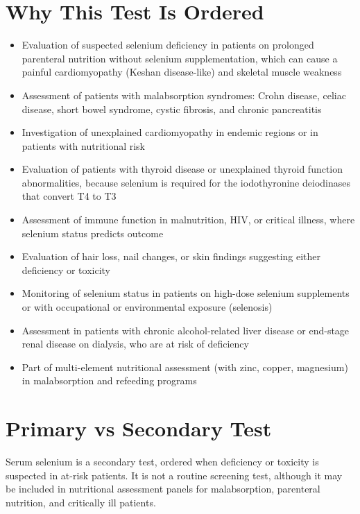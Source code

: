 \section*{Why This Test Is Ordered}
\begin{itemize}
  \item Evaluation of suspected selenium deficiency in patients on prolonged parenteral nutrition without selenium supplementation, which can cause a painful cardiomyopathy (Keshan disease-like) and skeletal muscle weakness
  \item Assessment of patients with malabsorption syndromes: Crohn disease, celiac disease, short bowel syndrome, cystic fibrosis, and chronic pancreatitis
  \item Investigation of unexplained cardiomyopathy in endemic regions or in patients with nutritional risk
  \item Evaluation of patients with thyroid disease or unexplained thyroid function abnormalities, because selenium is required for the iodothyronine deiodinases that convert T4 to T3
  \item Assessment of immune function in malnutrition, HIV, or critical illness, where selenium status predicts outcome
  \item Evaluation of hair loss, nail changes, or skin findings suggesting either deficiency or toxicity
  \item Monitoring of selenium status in patients on high-dose selenium supplements or with occupational or environmental exposure (selenosis)
  \item Assessment in patients with chronic alcohol-related liver disease or end-stage renal disease on dialysis, who are at risk of deficiency
  \item Part of multi-element nutritional assessment (with zinc, copper, magnesium) in malabsorption and refeeding programs
\end{itemize}

\section*{Primary vs Secondary Test}
Serum selenium is a secondary test, ordered when deficiency or toxicity is suspected in at-risk patients. It is not a routine screening test, although it may be included in nutritional assessment panels for malabsorption, parenteral nutrition, and critically ill patients.

